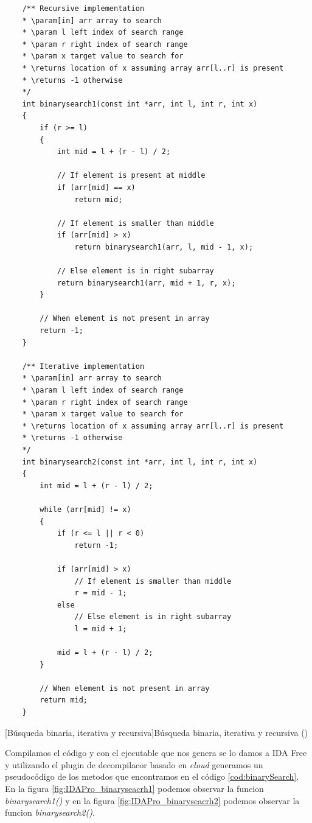 \begin{code}
    \begin{verbatim}
    /** Recursive implementation
    * \param[in] arr array to search
    * \param l left index of search range
    * \param r right index of search range
    * \param x target value to search for
    * \returns location of x assuming array arr[l..r] is present
    * \returns -1 otherwise
    */
    int binarysearch1(const int *arr, int l, int r, int x)
    {
        if (r >= l)
        {
            int mid = l + (r - l) / 2;

            // If element is present at middle
            if (arr[mid] == x)
                return mid;

            // If element is smaller than middle
            if (arr[mid] > x)
                return binarysearch1(arr, l, mid - 1, x);

            // Else element is in right subarray
            return binarysearch1(arr, mid + 1, r, x);
        }

        // When element is not present in array
        return -1;
    }

    /** Iterative implementation
    * \param[in] arr array to search
    * \param l left index of search range
    * \param r right index of search range
    * \param x target value to search for
    * \returns location of x assuming array arr[l..r] is present
    * \returns -1 otherwise
    */
    int binarysearch2(const int *arr, int l, int r, int x)
    {
        int mid = l + (r - l) / 2;

        while (arr[mid] != x)
        {
            if (r <= l || r < 0)
                return -1;

            if (arr[mid] > x)
                // If element is smaller than middle
                r = mid - 1;
            else
                // Else element is in right subarray
                l = mid + 1;

            mid = l + (r - l) / 2;
        }

        // When element is not present in array
        return mid;
    }
    \end{verbatim}
    [Búsqueda binaria, iterativa y recursiva]{Búsqueda binaria, iterativa y recursiva (\cite{BinarySearchGitHub})}
    \label{cod:binarySearch}
\end{code}

Compilamos el código y con el ejecutable que nos genera se lo damos a IDA Free y utilizando el plugin de decompilacor basado en \textit{cloud} generamos un pseudocódigo de los metodos
que encontramos en el código \ref{cod:binarySearch}. En la figura \ref{fig:IDAPro_binaryseacrh1} podemos observar la funcion \textit{binarysearch1()} y en la figura \ref{fig:IDAPro_binaryseacrh2}
podemos observar la funcion \textit{binarysearch2()}.

